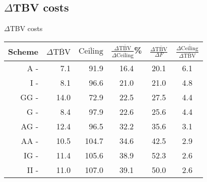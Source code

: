 \documentclass{beamer}
\begin{document}
\subsection{$\Delta$TBV costs}
\begin{frame}{$\Delta$TBV costs}
  \begin{center}
    \begin{tabular}{rrrccc}
      \hline
      Scheme & $\Delta\overline{\text{TBV}}$ & $\overline{\text{Ceiling}}$ & $\frac{\Delta\overline{\text{TBV}}}{\Delta\overline{\text{Ceiling}}}$\% & $\frac{\Delta\overline{\text{TBV}}}{\Delta F}$ & $\frac{\Delta\overline{\text{Ceiling}}}{\Delta\overline{\text{TBV}}}$\\
      \hline
       A - &  7.1 &  91.9 & 16.4 & 20.1 & 6.1\\
       I - &  8.1 &  96.6 & 21.0 & 21.0 & 4.8\\
      GG - & 14.0 &  72.9 & 22.5 & 27.5 & 4.4\\
       G - &  8.4 &  97.9 & 22.6 & 25.6 & 4.4\\
      AG - & 12.4 &  96.5 & 32.2 & 35.6 & 3.1\\
      AA - & 10.5 & 104.7 & 34.6 & 42.5 & 2.9\\
      IG - & 11.4 & 105.6 & 38.9 & 52.3 & 2.6\\
      II - & 11.0 & 107.0 & 39.1 & 50.0 & 2.6\\
      \hline
    \end{tabular}
  \end{center}
\end{frame}

\end{document}
